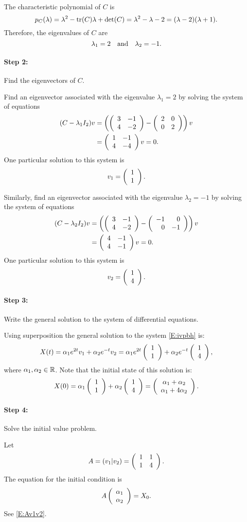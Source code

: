 \documentclass{ximera}
\begin{document}
The characteristic polynomial of $C$ is
\[
p_C(\lambda) = \lambda^2 -{\rm tr}(C)\lambda+\det(C) = \lambda^2-\lambda-2
= (\lambda-2)(\lambda+1).
\]
Therefore, the eigenvalues of $C$ are
\[
\lambda_1 = 2 \quad\mbox{and}\quad \lambda_2=-1.
\]

\paragraph{Step 2:}  Find the eigenvectors of $C$.

Find an eigenvector associated with the eigenvalue $\lambda_1 = 2$
by solving the system of equations
\begin{align*}
(C-\lambda_1I_2)v &= \left(\left(\begin{array}{rr} 3 & -1\\ 4 &-2\end{array}\right)-\left(\begin{array}{rr} 2 & 0\\ 0 &2\end{array}\right)\right)v \\
&= \left(\begin{array}{rr} 1 & -1\\ 4 &-4\end{array}\right)v = 0.
\end{align*}
One particular solution to this system is
\[
v_1 = \left(\begin{array}{r} 1 \\ 1\end{array}\right).
\]

Similarly, find an eigenvector associated with the eigenvalue
$\lambda_2 = -1$ by solving the system of equations
\begin{align*}
(C-\lambda_2I_2)v &= \left(\left(\begin{array}{rr} 3 & -1\\ 4 &-2\end{array}\right)-\left(\begin{array}{rr} -1 & 0\\ 0 &-1\end{array}\right)\right)v \\
&= \left(\begin{array}{rr} 4 & -1\\ 4 &-1\end{array}\right)v = 0.
\end{align*}
One particular solution to this system is
\[
v_2 = \left(\begin{array}{r} 1 \\ 4\end{array}\right).
\]

\paragraph{Step 3:}  Write the general solution to the 
system of differential equations.

Using superposition the general solution to the system \eqref{E:ivpbh} is:
\[
X(t) = \alpha_1e^{2t}v_1 + \alpha_2e^{-t}v_2 = \alpha_1e^{2t}\left(\begin{array}{r} 1 \\ 1\end{array}\right)
+ \alpha_2e^{-t}\left(\begin{array}{r} 1 \\ 4\end{array}\right),
\]
where $\alpha_1,\alpha_2\in\mbox{$\mathbb{R}$}$.  Note that the initial state of this solution
is:
\[
X(0) =  \alpha_1\left(\begin{array}{r} 1 \\ 1\end{array}\right)+\alpha_2\left(\begin{array}{r} 1 \\ 4\end{array}\right)
= \left(\begin{array}{c} \alpha_1 + \alpha_2 \\ \alpha_1+4\alpha_2\end{array}\right).
\]

\paragraph{Step 4:}  Solve the initial value problem.

Let
\[
A=(v_1|v_2) = \left(\begin{array}{rr} 1 & 1\\ 1 &4\end{array}\right).
\]
The equation for the initial condition is
\[
A\left(\begin{array}{r} \alpha_1 \\ \alpha_2\end{array}\right) = X_0.
\]
See \eqref{E:Av1v2}.
\end{document}
